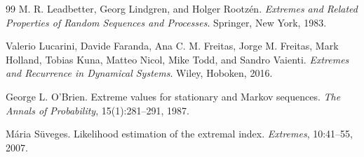 \documentclass[11pt]{article}
\begin{document}
{\begin{thebibliography}{99}
M. R. Leadbetter, Georg Lindgren, and Holger Rootz\'en.
\textit{Extremes and Related Properties of Random Sequences and Processes}.
Springer, New York, 1983.

Valerio Lucarini, Davide Faranda, Ana C. M. Freitas, Jorge M. Freitas, Mark Holland, Tobias Kuna, Matteo Nicol, Mike Todd, and Sandro Vaienti.
\textit{Extremes and Recurrence in Dynamical Systems}.
Wiley, Hoboken, 2016.

George L. O'Brien.
Extreme values for stationary and Markov sequences.
\textit{The Annals of Probability}, 15(1):281--291, 1987.

M\'aria S\"uveges.
Likelihood estimation of the extremal index.
\textit{Extremes}, 10:41--55, 2007.

\end{thebibliography}
}
\end{document}
